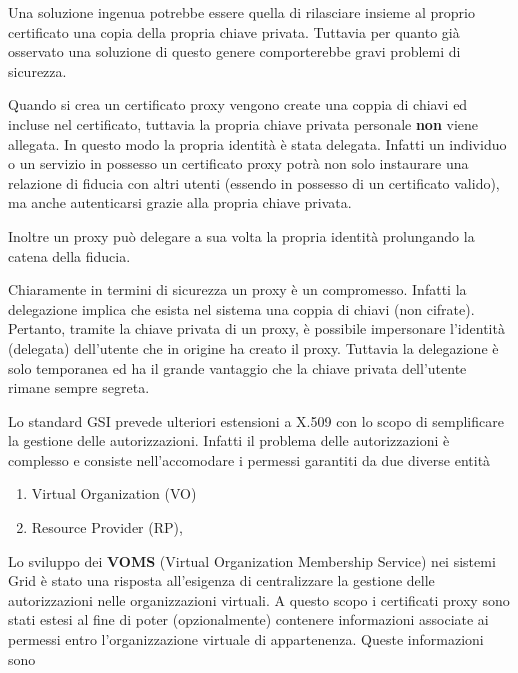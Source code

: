 \documentclass[italian,]{article}
\providecommand{\tightlist}{%
  \setlength{\itemsep}{0pt}\setlength{\parskip}{0pt}}
\begin{document}
Una soluzione ingenua potrebbe essere quella di rilasciare insieme al
proprio certificato una copia della propria chiave privata. Tuttavia per
quanto già osservato una soluzione di questo genere comporterebbe gravi
problemi di sicurezza.

Quando si crea un certificato proxy vengono create una coppia di chiavi
ed incluse nel certificato, tuttavia la propria chiave privata personale
\textbf{non} viene allegata. In questo modo la propria identità è stata
delegata. Infatti un individuo o un servizio in possesso un certificato
proxy potrà non solo instaurare una relazione di fiducia con altri
utenti (essendo in possesso di un certificato valido), ma anche
autenticarsi grazie alla propria chiave privata.

Inoltre un proxy può delegare a sua volta la propria identità
prolungando la catena della fiducia.

Chiaramente in termini di sicurezza un proxy è un compromesso. Infatti
la delegazione implica che esista nel sistema una coppia di chiavi (non
cifrate). Pertanto, tramite la chiave privata di un proxy, è possibile
impersonare l'identità (delegata) dell'utente che in origine ha creato
il proxy. Tuttavia la delegazione è solo temporanea ed ha il grande
vantaggio che la chiave privata dell'utente rimane sempre segreta.

Lo standard GSI prevede ulteriori estensioni a X.509 con lo scopo di
semplificare la gestione delle autorizzazioni. Infatti il problema delle
autorizzazioni è complesso e consiste nell'accomodare i permessi
garantiti da due diverse entità

\begin{enumerate}
\def\labelenumi{\arabic{enumi}.}
\tightlist
\item
  Virtual Organization (VO)
\item
  Resource Provider (RP),
\end{enumerate}

Lo sviluppo dei \textbf{VOMS} (Virtual Organization Membership Service)
nei sistemi Grid è stato una risposta all'esigenza di centralizzare la
gestione delle autorizzazioni nelle organizzazioni virtuali. A questo
scopo i certificati proxy sono stati estesi al fine di poter
(opzionalmente) contenere informazioni associate ai permessi entro
l'organizzazione virtuale di appartenenza. Queste informazioni sono
\end{document}
